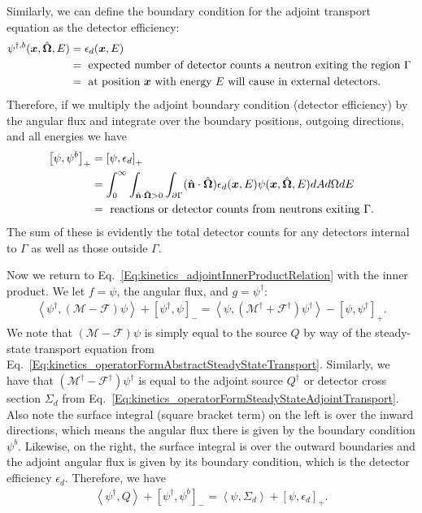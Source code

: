 Similarly, we can define the boundary condition for the adjoint transport equation as the detector efficiency:
\begin{align}
  \psi^{\dagger,b}(\bm{x},\hat{\mathbf{\Omega}},E) &= \epsilon_d(\bm{x},E) \nonumber \\
  &= \text{ expected number of detector counts a neutron exiting the region $\Gamma$ } \nonumber \\
  &= \text{ at position $\bm{x}$ with energy $E$ will cause in external detectors.}
\end{align}
Therefore, if we multiply the adjoint boundary condition (detector efficiency) by the angular flux and integrate over the boundary positions, outgoing directions, and all energies we have
\begin{align}
  \left[ \psi, \psi^b \right]_+ &= \left[ \psi, \epsilon_d \right]_+ \nonumber \\
  &= \int_0^\infty \int_{\hat{\mathbf{n}} \cdot \hat{\mathbf{\Omega}} > 0} \int_{\partial \Gamma} ( \hat{\mathbf{n}} \cdot \hat{\mathbf{\Omega}} ) \epsilon_d(\bm{x},E) \psi(\bm{x},\hat{\mathbf{\Omega}},E) dA d\Omega dE \nonumber \\
  &= \text{ reactions or detector counts from neutrons exiting $\Gamma$.}
\end{align}
The sum of these is evidently the total detector counts for any detectors internal to $\Gamma$ as well as those outside $\Gamma$.

Now we return to Eq.~\eqref{Eq:kinetics_adjointInnerProductRelation} with the inner product. We let $f = \psi$, the angular flux, and $g = \psi^\dagger$:
\begin{align}
  \left< \psi^\dagger, ( \mathcal{M} - \mathcal{F} ) \psi \right> + \left[ \psi^\dagger, \psi \right]_- = \left< \psi, ( \mathcal{M}^\dagger + \mathcal{F}^\dagger ) \psi^\dagger \right> - \left[ \psi, \psi^\dagger \right]_+ .
\end{align}
We note that $( \mathcal{M} - \mathcal{F} ) \psi$ is simply equal to the source $Q$ by way of the steady-state transport equation from Eq.~\eqref{Eq:kinetics_operatorFormAbstractSteadyStateTransport}. Similarly, we have that $( \mathcal{M}^\dagger - \mathcal{F}^\dagger ) \psi^\dagger$ is equal to the adjoint source $Q^\dagger$ or detector cross section $\Sigma_d$ from Eq.~\eqref{Eq:kinetics_operatorFormSteadyStateAdjointTransport}. Also note the surface integral (square bracket term) on the left is over the inward directions, which means the angular flux there is given by the boundary condition $\psi^b$. Likewise, on the right, the surface integral is over the outward boundaries and the adjoint angular flux is given by its boundary condition, which is the detector efficiency $\epsilon_d$. Therefore, we have
\begin{align}
  \left< \psi^\dagger, Q \right> + \left[ \psi^\dagger, \psi^b \right]_- = \left< \psi, \Sigma_d \right> + \left[ \psi, \epsilon_d \right]_+ .
\end{align}

